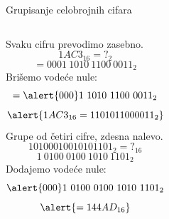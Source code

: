 \begin{frame}[label=04-s019]{Grupisanje celobrojnih cifara}
\setlength{\abovedisplayskip}{3pt}\setlength{\belowdisplayskip}{3pt}
\begin{columns}[T,onlytextwidth]
Svaku cifru prevodimo zasebno.
\[1AC3_{16}={?}_2\]
\[=0001\ 1010\ 1100\ 0011_2\]
Brišemo vodeće nule:
\[=\alert{000}1\ 1010\ 1100\ 0011_2\]
\[\alert{1AC3_{16}=1101011000011_2}\]
Grupe od četiri cifre, zdesna nalevo.
\[10100010010101101_2={?}_{16}\]
\[1\ 0100\ 0100\ 1010\ 1101_2\]
Dodajemo vodeće nule:
\[\alert{000}1\ 0100\ 0100\ 1010\ 1101_2\]
\[\alert{=144AD_{16}}\]
\end{columns}
\par\vspace{3mm}
\end{frame}
